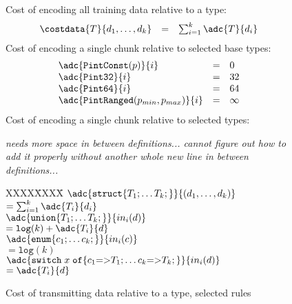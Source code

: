 \begin{figure}
Cost of encoding all training data relative to a type:
\[
\begin{array}{@{}lcl}
\costdata{T}{d_1,\ldots,d_k} &=& \sum_{i=1}^{k} \adc{T}{d_i} \\
\end{array}
\]
Cost of encoding a single chunk relative to selected base types:
\[
\begin{array}{@{}lcl}
\adc{\mathtt{PintConst}(p)}{i}      &=& 0 \\
\adc{\mathtt{Pint32}}{i}            &=& 32 \\
\adc{\mathtt{Pint64}}{i}            &=& 64 \\
\adc{\mathtt{PintRanged}(p_{min},p_{max})}{i} &=& \infty \\
\end{array}
\]
Cost of encoding a single chunk relative to selected types:

{\em needs more space in between definitions... cannot figure out how
to add it properly without another whole new line
in between definitions...}

\begin{tabbing}
XXXX\=XXXX\=\+\kill
$\adc{\mathtt{struct \{} T_1;\ldots T_k; \mathtt{\}}}{(d_1,\ldots,d_k)}$ \\
  \> $= \sum_{i=1}^{k} \adc{T_i}{d_i}$ \\ 
$\adc{\mathtt{union \{} T_1;\ldots T_k; \mathtt{\}}}{in_i(d)}$ \\            
  \> $= \mathtt{log}(k) + \adc{T_i}{d}$ \\
$\adc{\mathtt{enum \{} c_1;\ldots c_k; \mathtt{\}}}{in_i(c)}$ \\            
  \> $= \mathtt{log}(k)$ \vspace{3pt} \\
$\adc{
\mathtt{switch}\; x \; 
  \mathtt{of \{} 
    c_1 \mathtt{=>} T_1; \ldots  
    c_k \mathtt{=>} T_k; 
  \mathtt{\}}
}{in_i(d)}$ \\ 
  \> $= \adc{T_i}{d}$ \\
\end{tabbing}


\caption {Cost of transmitting data relative to a type, selected rules}
\label{fig:cost-data}
\end{figure}